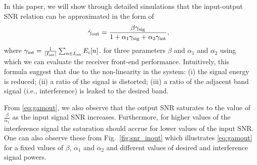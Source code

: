% 



In this paper, we will show through detailed simulations that the input-output SNR relation can be approximated in the form of
\begin{equation} \label{eq:gamout}
    \hat{\gamma}_{\rm out} = \frac{\beta \gamma_{\rm sig}}{
    1 + \alpha_1 \gamma_{\rm sig} + \alpha_2\gamma_{\rm int}},
\end{equation}
    where $\gamma_{\rm int} = \frac{1}{|I_{\rm int}|}\sum_{n \in I_{\rm int}}E_i[n]$.
for three parameters $\beta$ and $\alpha_1$ and $\alpha_2$
using which we can evaluate the receiver front-end performance. Intuitively, this formula suggest that due to the non-linearity in the system: (i) the signal energy is reduced; (ii) a ratio of the signal is distorted; (iii) a ratio of the adjacent band signal (i.e., interference) is leaked to the desired band.

From \eqref{eq:gamout}, we also observe that the output SNR saturates to the value of $\frac{\beta}{\alpha_1}$ as the input signal SNR increases. Furthermore, for higher values of the interference signal the saturation should accrue for lower values of the input SNR. One can also observe these from Fig.~\ref{fig:snr_inout} which illustrates \eqref{eq:gamout} for a fixed values of $\beta$, $\alpha_1$ and $\alpha_2$ and different values of desired and interference signal powers.






